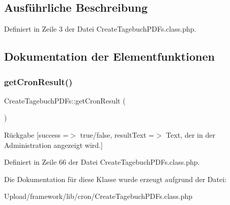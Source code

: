 \subsection{Ausführliche Beschreibung}


Definiert in Zeile 3 der Datei Create\+Tagebuch\+P\+D\+Fs.\+class.\+php.



\subsection{Dokumentation der Elementfunktionen}
\mbox{\label{class_create_tagebuch_p_d_fs_a90a43d1426e7be211b76be8108641067}} 
\subsubsection{\texorpdfstring{get\+Cron\+Result()}{getCronResult()}}
{\footnotesize\ttfamily Create\+Tagebuch\+P\+D\+Fs\+::get\+Cron\+Result (\begin{DoxyParamCaption}{ }\end{DoxyParamCaption})}

\begin{DoxyReturn}{Rückgabe}
\mbox{[}\textquotesingle{}success\textquotesingle{} =$>$ \textquotesingle{}true/false\textquotesingle{}, \textquotesingle{}result\+Text\textquotesingle{} =$>$ \textquotesingle{}Text, der in der Administration angezeigt wird.\textquotesingle{}\mbox{]} 
\end{DoxyReturn}


Definiert in Zeile 66 der Datei Create\+Tagebuch\+P\+D\+Fs.\+class.\+php.



Die Dokumentation für diese Klasse wurde erzeugt aufgrund der Datei\+:\begin{DoxyCompactItemize}
\item 
Upload/framework/lib/cron/Create\+Tagebuch\+P\+D\+Fs.\+class.\+php\end{DoxyCompactItemize}

